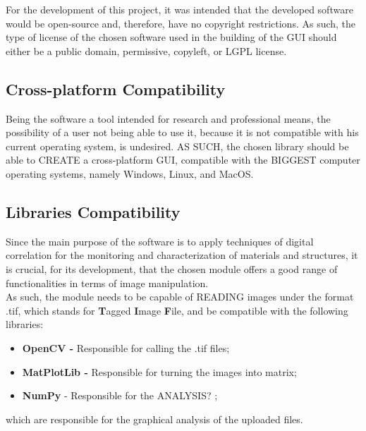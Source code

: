 For the development of this project, it was intended that the developed software would be open-source and, therefore, have no copyright restrictions. As such, the type of license of the chosen software used in the building of the GUI should either be a public domain, permissive, copyleft, or LGPL license.


\subsection{Cross-platform Compatibility}
\label{sub:platform_compatibility}

Being the software a tool intended for research and professional means, the possibility of a user not being able to use it, because it is not compatible with his current operating system, is undesired. AS SUCH, the chosen library should be able to CREATE a cross-platform GUI, compatible with the BIGGEST computer operating systems, namely Windows, Linux, and MacOS.


\subsection{Libraries Compatibility}
\label{sub:libraries_compatibility}

Since the main purpose of the software is to apply techniques of digital correlation for the monitoring and characterization of materials and structures, it is crucial, for its development, that the chosen module offers a good range of functionalities in terms of image manipulation.\\

As such, the module needs to be capable of READING images under the format .tif, which stands for \textbf{T}agged \textbf{I}mage \textbf{F}ile, and be compatible with the following libraries:
\begin{itemize}
  \item \textbf{OpenCV -} Responsible for calling the .tif files;
  \item \textbf{MatPlotLib -} Responsible for turning the images into matrix;
  \item \textbf{NumPy} - Responsible for the ANALYSIS? ;
\end{itemize}
which are responsible for the graphical analysis of the uploaded files.

